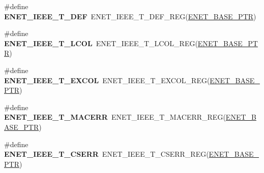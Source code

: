 \begin{DoxyCompactItemize}
\item 
\hypertarget{group___e_n_e_t___register___accessor___macros_ga669d751037e044b7415910a465762fd5}{}\#define {\bfseries E\+N\+E\+T\+\_\+\+I\+E\+E\+E\+\_\+\+T\+\_\+\+D\+E\+F}~E\+N\+E\+T\+\_\+\+I\+E\+E\+E\+\_\+\+T\+\_\+\+D\+E\+F\+\_\+\+R\+E\+G(\hyperlink{group___e_n_e_t___peripheral_gab64a2d991cc2bd76dd55ee25a52dcb5c}{E\+N\+E\+T\+\_\+\+B\+A\+S\+E\+\_\+\+P\+T\+R})\label{group___e_n_e_t___register___accessor___macros_ga669d751037e044b7415910a465762fd5}

\item 
\hypertarget{group___e_n_e_t___register___accessor___macros_ga910889e1ce4ca3cb9c3cb3cca360c9a9}{}\#define {\bfseries E\+N\+E\+T\+\_\+\+I\+E\+E\+E\+\_\+\+T\+\_\+\+L\+C\+O\+L}~E\+N\+E\+T\+\_\+\+I\+E\+E\+E\+\_\+\+T\+\_\+\+L\+C\+O\+L\+\_\+\+R\+E\+G(\hyperlink{group___e_n_e_t___peripheral_gab64a2d991cc2bd76dd55ee25a52dcb5c}{E\+N\+E\+T\+\_\+\+B\+A\+S\+E\+\_\+\+P\+T\+R})\label{group___e_n_e_t___register___accessor___macros_ga910889e1ce4ca3cb9c3cb3cca360c9a9}

\item 
\hypertarget{group___e_n_e_t___register___accessor___macros_gac4beb3a2331f2a6497df362de43e3072}{}\#define {\bfseries E\+N\+E\+T\+\_\+\+I\+E\+E\+E\+\_\+\+T\+\_\+\+E\+X\+C\+O\+L}~E\+N\+E\+T\+\_\+\+I\+E\+E\+E\+\_\+\+T\+\_\+\+E\+X\+C\+O\+L\+\_\+\+R\+E\+G(\hyperlink{group___e_n_e_t___peripheral_gab64a2d991cc2bd76dd55ee25a52dcb5c}{E\+N\+E\+T\+\_\+\+B\+A\+S\+E\+\_\+\+P\+T\+R})\label{group___e_n_e_t___register___accessor___macros_gac4beb3a2331f2a6497df362de43e3072}

\item 
\hypertarget{group___e_n_e_t___register___accessor___macros_ga38b6b791435ad388824e6a0a20637452}{}\#define {\bfseries E\+N\+E\+T\+\_\+\+I\+E\+E\+E\+\_\+\+T\+\_\+\+M\+A\+C\+E\+R\+R}~E\+N\+E\+T\+\_\+\+I\+E\+E\+E\+\_\+\+T\+\_\+\+M\+A\+C\+E\+R\+R\+\_\+\+R\+E\+G(\hyperlink{group___e_n_e_t___peripheral_gab64a2d991cc2bd76dd55ee25a52dcb5c}{E\+N\+E\+T\+\_\+\+B\+A\+S\+E\+\_\+\+P\+T\+R})\label{group___e_n_e_t___register___accessor___macros_ga38b6b791435ad388824e6a0a20637452}

\item 
\hypertarget{group___e_n_e_t___register___accessor___macros_ga21185b524641acfbeb1f2c5f1c7231bc}{}\#define {\bfseries E\+N\+E\+T\+\_\+\+I\+E\+E\+E\+\_\+\+T\+\_\+\+C\+S\+E\+R\+R}~E\+N\+E\+T\+\_\+\+I\+E\+E\+E\+\_\+\+T\+\_\+\+C\+S\+E\+R\+R\+\_\+\+R\+E\+G(\hyperlink{group___e_n_e_t___peripheral_gab64a2d991cc2bd76dd55ee25a52dcb5c}{E\+N\+E\+T\+\_\+\+B\+A\+S\+E\+\_\+\+P\+T\+R})\label{group___e_n_e_t___register___accessor___macros_ga21185b524641acfbeb1f2c5f1c7231bc}


\end{DoxyCompactItemize}
